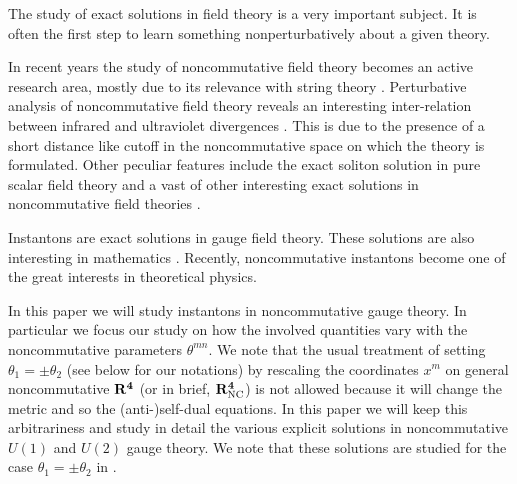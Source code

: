 \documentclass[a4paper,a4paper]{article}
\begin{document}
The study of exact solutions in field theory is a very important
subject. It is often the first step to learn something
nonperturbatively about a given theory.

In recent years the study of noncommutative field theory becomes
an active research area, mostly due to its relevance with string
theory \cite{WittenSeiberg}. Perturbative analysis of
noncommutative field theory reveals an interesting inter-relation
between infrared and ultraviolet divergences \cite{Seiberg}. This
is due to the presence of a short distance like cutoff in the
noncommutative space on which the theory is formulated. Other
peculiar features include the exact soliton solution in pure
scalar field theory \cite{GSM} and a vast of other interesting
exact solutions in noncommutative field theories \cite{Harvey}.

Instantons are exact solutions in gauge field theory. These
solutions are also interesting in mathematics \cite{Donaldson}.
Recently, noncommutative instantons \cite{Schwarz} become one of
the great interests in theoretical physics.

In this paper we will study instantons in noncommutative gauge
theory. In particular we focus our study on how the involved
quantities vary with the noncommutative parameters $\theta^{mn}$.
We note that the usual treatment of setting $\theta_1=\pm\theta_2$
(see below for our notations) by rescaling the coordinates $x^m$
on general noncommutative $\bf{R}^4$ (or in brief, $\bf{R}_{\rm
NC}^4$) is not allowed because it will change the metric and so
the (anti-)self-dual equations. In this paper we will keep this
arbitrariness and study in detail the various explicit solutions
in noncommutative $U(1)$ and $U(2)$ gauge theory. We note that
these solutions are studied for the case $\theta_1=\pm\theta_2$ in
\cite{Papera,Paperb,Paperc,Paperd,Hamanaka}.
\end{document}
